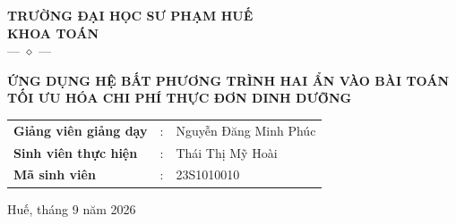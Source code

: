 \documentclass[12pt,a4paper]{article}
\begin{document}
\begin{titlepage}

    \centering
    \vspace*{0.2cm}
    {\large \textbf{TRƯỜNG ĐẠI HỌC SƯ PHẠM HUẾ}}\\
     {\large \textbf{KHOA TOÁN}}\\
    \vspace{0.2cm}
    --- $\diamond$ ---

\vspace{6cm}

    
    {\Large \textbf{ỨNG DỤNG HỆ BẤT PHƯƠNG TRÌNH HAI ẨN VÀO BÀI TOÁN TỐI ƯU HÓA CHI PHÍ THỰC ĐƠN DINH DƯỠNG}}\\
 

    \vspace{2.5cm}
    \large
    \renewcommand{\arraystretch}{1.3}
    \begin{tabular}{lcl}
    \textbf{Giảng viên giảng dạy} & : &Nguyễn Đăng Minh Phúc\\
        \textbf{Sinh viên thực hiện} & : &Thái Thị Mỹ Hoài \\
        \textbf{Mã sinh viên} & : &23S1010010
    \end{tabular}

    \vfill
    {\large Huế, tháng 9 năm 2026}
    \vspace*{0.2cm}
\end{titlepage}

\end{document}
